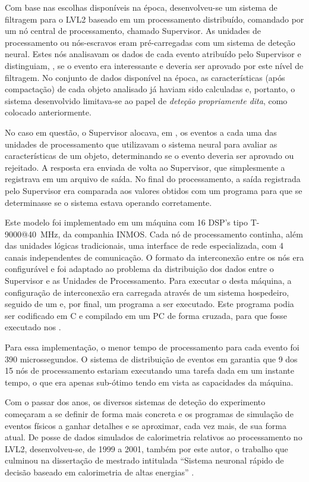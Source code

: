 Com base nas escolhas disponíveis na época, desenvolveu-se um sistema de
filtragem para o LVL2 baseado em um processamento distribuído, comandado por
um nó central de processamento, chamado Supervisor. As unidades de
processamento ou nós-escravos eram pré-carregadas com um sistema de deteção
neural. Estes nós analisavam os dados de cada evento atribuído pelo Supervisor
e distinguiam, , se o evento era interessante e deveria ser
aprovado por este nível de filtragem. No conjunto de dados disponível na
época, as características (após compactação) de cada objeto analisado já
haviam sido calculadas e, portanto, o sistema desenvolvido limitava-se ao papel
de \textit{deteção propriamente dita}, como colocado anteriormente.

No caso em questão, o Supervisor alocava, em , os eventos a
cada uma das unidades de processamento que utilizavam o sistema neural para
avaliar as características de um objeto, determinando se o evento deveria ser
aprovado ou rejeitado. A resposta era enviada de volta ao Supervisor, que
simplesmente a registrava em um arquivo de saída. No final do processamento, a
saída registrada pelo Supervisor era comparada aos valores obtidos com um
programa  para que se determinasse se o sistema estava operando
corretamente.

Este modelo foi implementado em um máquina com 16 DSP's tipo T-9000@40~MHz, da
companhia INMOS. Cada nó de processamento continha, além das unidades lógicas
tradicionais, uma interface de rede especializada, com 4 canais independentes
de comunicação. O formato da interconexão entre os nós era configurável e foi
adaptado ao problema da distribuição dos dados entre o Supervisor e as
Unidades de Processamento. Para executar o  desta máquina, a
configuração de interconexão era carregada através de um sistema hospedeiro,
seguido de um  e, por final, um programa a ser
executado. Este programa podia ser codificado em C e compilado em um PC de
forma cruzada, para que fosse executado nos
.

Para essa implementação, o menor tempo de processamento para cada evento foi
390 microssegundos. O sistema de distribuição de eventos em
 garantia que 9 dos 15 nós de processamento estariam
executando uma tarefa dada em um instante tempo, o que era apenas sub-ótimo
tendo em vista as capacidades da máquina.

Com o passar dos anos, os diversos sistemas de deteção do experimento
começaram a se definir de forma mais concreta e os programas de simulação de
eventos físicos a ganhar detalhes e se aproximar, cada vez mais, de sua forma
atual. De posse de dados simulados de calorimetria relativos ao processamento
no LVL2, desenvolveu-se, de 1999 a 2001, também por este autor, o trabalho que
culminou na dissertação de mestrado intitulada ``Sistema neuronal rápido de
decisão baseado em calorimetria de altas energias'' \cite{aa:msc-thesis}.

